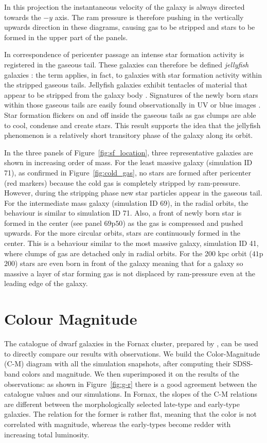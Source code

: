 In this projection the instantaneous velocity of the galaxy is always directed towards the $-y$ axis.
The ram pressure is therefore pushing in the vertically upwards direction in these diagrams, causing gas to be stripped and stars to be formed in the upper part of the panels.

In correspondence of pericenter passage an intense star formation activity is registered in the gaseous tail.
These galaxies can therefore be defined \emph{jellyfish} galaxies \citep{Ebeling2013}:
the term applies, in fact, to galaxies with star formation activity within the stripped gaseous tails.
Jellyfish galaxies exhibit tentacles of material that appear to be stripped from the galaxy body \citep{Poggianti2017a, Poggianti2019b, Ramatsoku2020}.
Signatures of the newly born stars within those gaseous tails are easily found observationally in UV or blue images \citep{Cortese2007,Smith2010a}.
Star formation flickers on and off inside the gaseous tails as gas clumps are able to cool, condense and create stars.
This result supports the idea that the jellyfish phenomenon is a relatively short transitory phase of the galaxy along its orbit.

In the three panels of Figure~\ref{fig:sf_location}, three representative galaxies are shown in increasing order of mass.
For the least massive galaxy (simulation ID 71), as confirmed in Figure~\ref{fig:cold_gas}, no stars are formed after pericenter (red markers) because the cold gas is completely stripped by ram-pressure.
However, during the stripping phase new star particles appear in the gaseous tail.
For the intermediate mass galaxy (simulation ID 69), in the radial orbits, the behaviour is similar to simulation ID 71.
Also, a front of newly born star is formed in the center (see panel $69$p$50$) as the gas is compressed and pushed upwards.
For the more circular orbits, stars are continuously formed in the center.
This is a behaviour similar to the most massive galaxy, simulation ID 41, where clumps of gas are detached only in radial orbits.
For the 200 kpc orbit ($41$p$200$) stars are even born in front of the galaxy meaning that for a galaxy so massive a layer of star forming gas is not displaced by ram-pressure even at the leading edge of the galaxy.

\section{Colour Magnitude} \label{sec:CM}
The catalogue of dwarf galaxies in the Fornax cluster, prepared by \citet{Venhola2019}, can be used to directly compare our results with observations.
We build the Color-Magnitude (C-M) diagram with all the simulation snapshots, after computing their SDSS-band colors and magnitude.
We then superimposed it on the results of the observations: as shown in Figure~\ref{fig:g-r} there is a good agreement between the catalogue values and our simulations.
In Fornax, the slopes of the C-M relations are different between the morphologically selected late-type and early-type galaxies.
The relation for the former is rather flat, meaning that the color is not correlated with magnitude, whereas the early-types become redder with increasing total luminosity.

